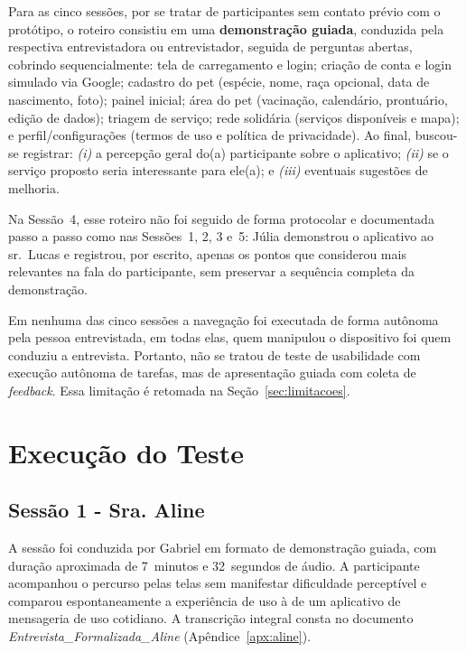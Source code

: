 \documentclass[
    12pt,
    openright,
    oneside,
    a4paper
]{abntex2}
\begin{document}
Para as cinco sessões, por se tratar de participantes sem contato prévio com o protótipo, o
roteiro consistiu em uma \textbf{demonstração guiada}, conduzida pela respectiva
entrevistadora ou entrevistador, seguida de perguntas abertas, cobrindo sequencialmente: tela
de carregamento e login; criação de conta e login simulado via Google; cadastro do pet
(espécie, nome, raça opcional, data de nascimento, foto); painel inicial; área do pet
(vacinação, calendário, prontuário, edição de dados); triagem de serviço; rede solidária
(serviços disponíveis e mapa); e perfil/configurações (termos de uso e política de
privacidade). Ao final, buscou-se registrar: \emph{(i)} a percepção geral do(a) participante
sobre o aplicativo; \emph{(ii)} se o serviço proposto seria interessante para ele(a); e
\emph{(iii)} eventuais sugestões de melhoria.

Na Sessão~4, esse roteiro não foi seguido de forma protocolar e documentada passo a passo
como nas Sessões~1, 2, 3 e~5: Júlia demonstrou o aplicativo ao sr.~Lucas e registrou, por
escrito, apenas os pontos que considerou mais relevantes na fala do participante, sem
preservar a sequência completa da demonstração.

Em nenhuma das cinco sessões a navegação foi executada de
forma autônoma pela pessoa entrevistada, em todas elas, quem manipulou o dispositivo foi
quem conduziu a entrevista. Portanto, não se tratou de teste de usabilidade com execução
autônoma de tarefas, mas de apresentação guiada com coleta de \textit{feedback}. Essa
limitação é retomada na Seção~\ref{sec:limitacoes}.

\chapter{Execução do Teste}

\section{Sessão 1 - Sra. Aline}

A sessão foi conduzida por Gabriel em formato de demonstração guiada, com duração aproximada
de 7~minutos e 32~segundos de áudio. A participante acompanhou o percurso pelas telas sem
manifestar dificuldade perceptível e comparou espontaneamente a experiência de uso à de um
aplicativo de mensageria de uso cotidiano. A transcrição integral consta no documento \textit{Entrevista\_Formalizada\_Aline}
(Apêndice~\ref{apx:aline}).
\end{document}
